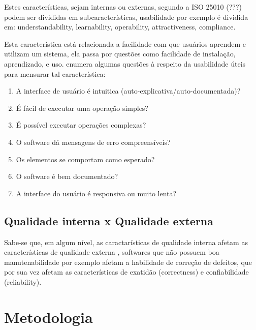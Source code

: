 \documentclass[12pt]{article}
\begin{document}
Estes características, sejam internas ou externas, segundo a ISO 25010 (???)
podem ser divididas em subcaracterísticas, usabilidade por exemplo é dividida
em: understandability, learnability, operability, attractiveness, compliance.

Esta característica está relacionada a facilidade com que usuários aprendem e
utilizam um sistema, ela passa por questões como facilidade de instalação,
aprendizado, e uso.  enumera algumas
questões à respeito da usabilidade úteis para mensurar tal característica:

\begin{enumerate}
  \item A interface de usuário é intuitica (auto-explicativa/auto-documentada)?
  \item É fácil de executar uma operação simples?
  \item É possível executar operações complexas?
  \item O software dá mensagens de erro compreensíveis?
  \item Os elementos se comportam como esperado?
  \item O software é bem documentado?
  \item A interface do usuário é responsiva ou muito lenta?
\end{enumerate}

\subsection{Qualidade interna x Qualidade externa}

Sabe-se que, em algum nível, as caractarísticas de qualidade interna afetam as
características de qualidade externa \cite{McConnell2004}, softwares que não
possuem boa manutenabilidade por exemplo afetam a habilidade de correção de
defeitos, que por sua vez afetam as características de exatidão (correctness)
e confiabilidade (reliability).



\section{Metodologia}
\end{document}

